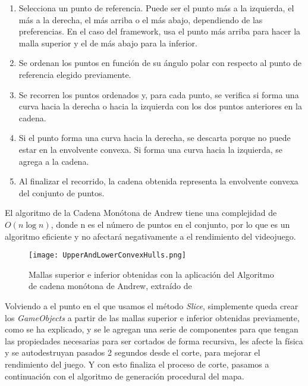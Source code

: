 \begin{enumerate}
    \item Selecciona un punto de referencia. Puede ser el punto más a la izquierda, el más a la derecha, el más arriba o el más abajo, dependiendo de las preferencias. En el caso del framework, usa el punto más arriba para hacer la malla superior y el de más abajo para la inferior.
    
    \item Se ordenan los puntos en función de su ángulo polar con respecto al punto de referencia elegido previamente.
    
    \item Se recorren los puntos ordenados y, para cada punto, se verifica si forma una curva hacia la derecha o hacia la izquierda con los dos puntos anteriores en la cadena.
    
    \item Si el punto forma una curva hacia la derecha, se descarta porque no puede estar en la envolvente convexa. Si forma una curva hacia la izquierda, se agrega a la cadena.
    
    \item Al finalizar el recorrido, la cadena obtenida representa la envolvente convexa del conjunto de puntos.
    
\end{enumerate}

El algoritmo de la Cadena Monótona de Andrew tiene una complejidad de $O(n \log n)$, donde n es el número de puntos en el conjunto, por lo que es un algoritmo eficiente y no afectará negativamente a el rendimiento del videojuego.

\begin{figure}[H]
    \centering
    \texttt{[image: UpperAndLowerConvexHulls.png]}
    \caption{Mallas superior e inferior obtenidas con la aplicación del Algoritmo de cadena monótona de Andrew, extraído de \cite{MonotoneChain}}
\end{figure}

Volviendo a el punto en el que usamos el método \textit{Slice}, simplemente queda crear los \textit{GameObjects} a partir de las mallas superior e inferior obtenidas previamente, como se ha explicado, y se le agregan una serie de componentes para que tengan las propiedades necesarias para ser cortados de forma recursiva, les afecte la física y se autodestruyan pasados 2 segundos desde el corte, para mejorar el rendimiento del juego. Y con esto finaliza el proceso de corte, pasamos a continuación con el algoritmo de generación procedural del mapa.

